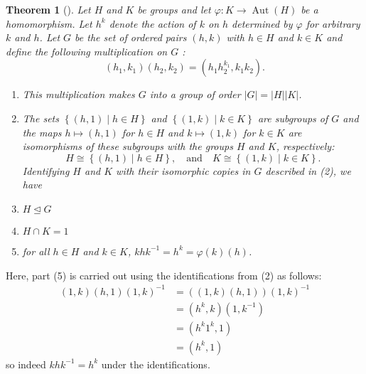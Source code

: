 \documentclass[reqno]{amsart}
\newtheorem{theorem}{Theorem}[section]
\theoremstyle{definition}
\theoremstyle{remark}
\DeclareMathOperator{\Aut}{Aut}
\begin{document}
\begin{theorem}[]\label{semi-direct-prod}
    Let $H$ and $K$ be groups and let $\varphi \colon K \to \Aut (H)$ be
    a homomorphism. Let $h^{k}$ denote the action of $k$ on $h$ determined by
    $\varphi$ for arbitrary $k$ and $h$. Let $G$ be the set of ordered
    pairs $\left( h,k \right) $ with $h \in H$ and $k \in K$ and define the
    following multiplication on $G$ :
    \[
        \left( h_1, k_1 \right) \left( h_2, k_2 \right) =
        \left( h_1 h_2^{k_1}, k_1k_2 \right).
    \] 
    \begin{enumerate}
        \item This multiplication makes $G$ into a group of order
            $\left| G \right| = \left| H \right| \left| K \right| $.
        \item The sets $\left\{ \left( h,1 \right) \mid h \in H  \right\} $
            and $\left\{ \left( 1,k \right)  \mid k \in K \right\} $ are
            subgroups of $G$ and the maps $h \mapsto (h,1)$ for
            $h \in H$ and $k \mapsto \left( 1,k \right) $ for $k \in K$ 
            are isomorphisms of these subgroups with the groups $H$ and $K$,
            respectively:
            \[
            H \cong \left\{ \left( h,1 \right)  \mid h \in H \right\} ,
            \quad \text{and} \quad K \cong \left\{ \left( 1,k \right)  \mid 
            k \in K \right\} .
            \] 
            Identifying $H$ and $K$ with their isomorphic copies in $G$ 
            described in (2), we have
        \item $H \trianglelefteq G$ 
        \item $H \cap K = 1$ 
        \item for all $h \in H$ and $k \in K$, $k h k^{-1} = h^{k}
            = \varphi (k) (h)$.
    \end{enumerate}
\end{theorem}

Here, part (5) is carried out using the identifications from (2) as follows:
\begin{align*}
    (1,k) (h,1) (1,k)^{-1}
    &=
    \left( \left( 1,k \right) (h,1) \right) (1,k)^{-1}\\
    &= \left(  h^{k}, k \right) \left( 1,k^{-1} \right)\\
    &= \left( h^{k} 1^{k}, 1 \right) \\
    &= \left( h^{k}, 1 \right) 
\end{align*}
so indeed $khk^{-1} = h^{k}$ under the identifications.
\end{document}
